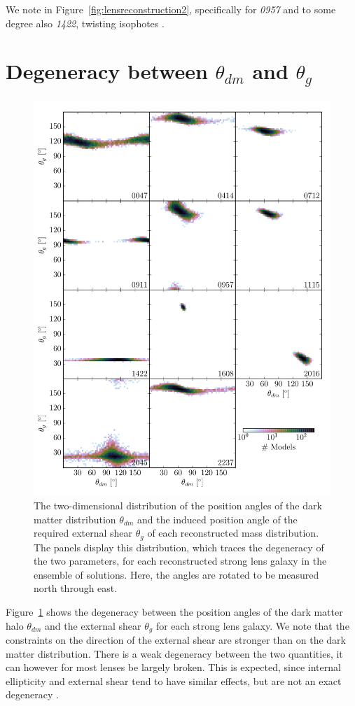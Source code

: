 \documentclass[useAMS,usenatbib]{mn2e}
\begin{document}
We note in Figure~\ref{fig:lensreconstruction2}, specifically for {\it0957} and to some degree also {\it1422}, twisting isophotes \citep[e.g.][]{1978ComAp...8...27B}.

\section{Degeneracy between $\theta_{dm}$ and $\theta_{g}$}\label{sec:shearshapedeg}
\begin{figure}
  \centering
  \includegraphics[width=.93\linewidth]{Figures/theta_scatter.pdf}
  \caption[width=\linewidth]{The two-dimensional distribution of the position angles of the dark matter distribution $\theta_{dm}$ and the induced position angle of the required external shear $\theta_{g}$ of each reconstructed mass distribution. The panels display this distribution, which traces the degeneracy of the two parameters, for each reconstructed strong lens galaxy in the ensemble of solutions. Here, the angles are rotated to be measured north through east.}
  \label{fig:thetascatter}
\end{figure}

Figure~\ref{fig:thetascatter} shows the degeneracy between the position angles of the dark matter halo $\theta_{dm}$ and the external shear $\theta_{g}$ for each strong lens galaxy. We note that the constraints on the direction of the external shear are stronger than on the dark matter distribution. There is a weak degeneracy between the two quantities, it can however for most lenses be largely broken. This is expected, since internal ellipticity and external shear tend to have similar effects, but are not an exact degeneracy \cite[cf.][]{1999A&A...349..108D}.
\end{document}
